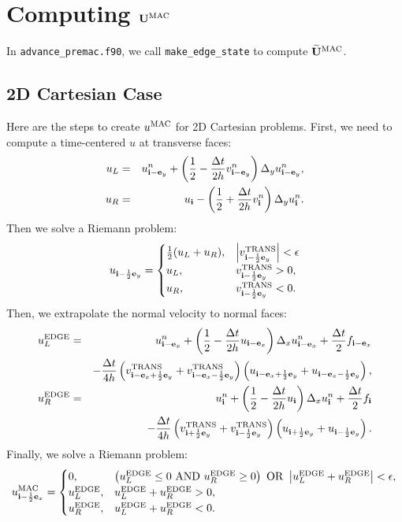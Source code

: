 \documentclass[11pt]{article}
\def\half  {\frac{1}{2}}
\def\dt    {\Delta t}
\def\edge  {\rm EDGE}
\def\mac   {\rm MAC}
\def\trans {\rm TRANS}
\def\eb    {{\bf e}}
\def\ib    {{\bf i}}
\def\Ub    {{\bf U}}
\def\Ubt   {\widetilde{\bf U}}
\begin{document}
\section{Computing $\Ub^{\mac}$}
In {\tt advance\_premac.f90}, we call {\tt make\_edge\_state} to compute $\Ubt^{\mac}$.
\subsection{2D Cartesian Case}
Here are the steps to create $u^{\mac}$ for 2D Cartesian problems.  First, we need to compute a time-centered $u$ at transverse faces:
\begin{eqnarray}
u_L &=& u_{\ib-\eb_y}^n + \left(\half - \frac{\dt}{2h}v_{\ib-\eb_y}^n\right)\Delta_y u_{\ib-\eb_y}^n, \\
u_R &=& u_{\ib} - \left(\half + \frac{\dt}{2h}v_{\ib}^n\right)\Delta_y u_{\ib}^n.
\end{eqnarray}
Then we solve a Riemann problem:
\begin{equation}
u_{\ib-\half\eb_y} =
\begin{cases}
\half(u_L + u_R), & \left|v^{\trans}_{\ib-\half\eb_y}\right| < \epsilon \\
u_L, & v^{\trans}_{\ib-\half\eb_y} > 0, \\
u_R, & v^{\trans}_{\ib-\half\eb_y} < 0. \\
\end{cases}
\end{equation}
Then, we extrapolate the normal velocity to normal faces:
\begin{eqnarray}
u_L^{\edge} &=& u_{\ib-\eb_x}^n + \left(\half - \frac{\dt}{2h}u_{\ib-\eb_x}\right)\Delta_x u_{\ib-\eb_x}^n + \frac{\dt}{2}f_{\ib-\eb_x} \nonumber \\
&& - \frac{\dt}{4h}\left(v_{\ib-\eb_x+\half\eb_y}^{\trans}+v_{\ib-\eb_x-\half\eb_y}^{\trans}\right)\left(u_{\ib-\eb_x+\half\eb_y}+u_{\ib-\eb_x-\half\eb_y}\right), \\
u_R^{\edge} &=& u_{\ib}^n + \left(\half - \frac{\dt}{2h}u_{\ib}\right)\Delta_x u_{\ib}^n + \frac{\dt}{2}f_{\ib} \nonumber \\
&& - \frac{\dt}{4h}\left(v_{\ib+\half\eb_y}^{\trans}+v_{\ib-\half\eb_y}^{\trans}\right)\left(u_{\ib+\half\eb_y}+u_{\ib-\half\eb_y}\right). \\
\end{eqnarray}
Finally, we solve a Riemann problem:
\begin{equation}
u_{\ib-\half\eb_x}^{\mac} =
\begin{cases}
0, & \left(u_L^{\edge} \le 0 ~ {\rm AND} ~ u_R^{\edge} \ge 0\right) ~ {\rm OR} ~ \left|u_L^{\edge} + u_R^{\edge}\right| < \epsilon, \\
u_L^{\edge}, & u_L^{\edge} + u_R^{\edge} > 0, \\
u_R^{\edge}, & u_L^{\edge} + u_R^{\edge} < 0. 
\end{cases}
\end{equation}
\end{document}
